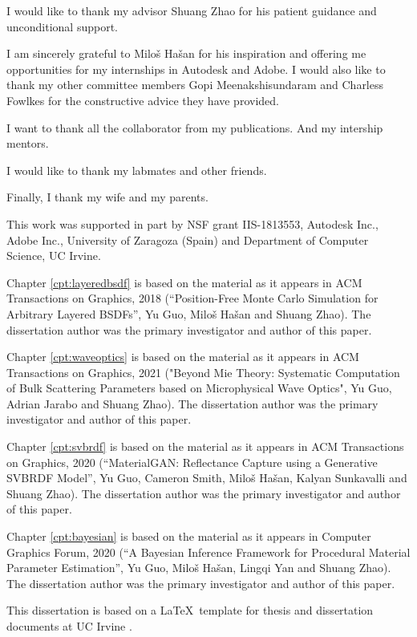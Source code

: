 \acknowledgments
{
  I would like to thank my advisor Shuang Zhao for his patient guidance and unconditional support.
  
  I am sincerely grateful to Milo\v{s} Ha\v{s}an for his inspiration and offering me opportunities for my internships in Autodesk and Adobe. I would also like to thank my other committee members Gopi Meenakshisundaram and Charless Fowlkes for the constructive advice they have provided. 
  
  I want to thank all the collaborator from my publications.
  And my intership mentors.
  
  I would like to thank my labmates and other friends.
  
  Finally, I thank my wife and my parents.
  
  This work was supported in part by NSF grant IIS-1813553, Autodesk Inc., Adobe Inc., University of Zaragoza (Spain) and Department of Computer Science, UC Irvine.
  
  Chapter \ref{cpt:layeredbsdf} is based on the material as it appears in ACM Transactions on Graphics, 2018
  (“Position-Free Monte Carlo Simulation for Arbitrary Layered BSDFs”, Yu Guo, Milo\v{s} Ha\v{s}an and Shuang Zhao). The dissertation author was the primary investigator and author of this paper.
  
  Chapter \ref{cpt:waveoptics} is based on the material as it appears in ACM Transactions on Graphics, 2021
  ("Beyond Mie Theory: Systematic Computation of Bulk Scattering Parameters based on Microphysical Wave Optics", Yu Guo, Adrian Jarabo and Shuang Zhao). The dissertation author was the primary investigator and author of this paper.
  
  Chapter \ref{cpt:svbrdf} is based on the material as it appears in ACM Transactions on Graphics, 2020
  (“MaterialGAN: Reflectance Capture using a Generative SVBRDF Model”, Yu Guo, Cameron Smith, Milo\v{s} Ha\v{s}an, Kalyan Sunkavalli and Shuang Zhao). The dissertation author was the primary investigator and author of this paper.
  
  Chapter \ref{cpt:bayesian} is based on the material as it appears in Computer Graphics Forum, 2020
  (“A Bayesian Inference Framework for Procedural Material Parameter Estimation”, Yu Guo, Milo\v{s} Ha\v{s}an, Lingqi Yan and Shuang Zhao). The dissertation author was the primary investigator and author of this paper.

  This dissertation is based on a \LaTeX~template for thesis and dissertation documents at UC Irvine \cite{uci-thesis-latex}.
}


